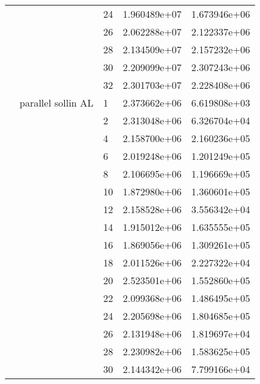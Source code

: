 \begin{tabular}{lllrr}
                      &                     & 24 &  1.960489e+07 &  1.673946e+06 \\
                      &                     & 26 &  2.062288e+07 &  2.122337e+06 \\
                      &                     & 28 &  2.134509e+07 &  2.157232e+06 \\
                      &                     & 30 &  2.209099e+07 &  2.307243e+06 \\
                      &                     & 32 &  2.301703e+07 &  2.228408e+06 \\
                      & parallel sollin AL & 1  &  2.373662e+06 &  6.619808e+03 \\
                      &                     & 2  &  2.313048e+06 &  6.326704e+04 \\
                      &                     & 4  &  2.158700e+06 &  2.160236e+05 \\
                      &                     & 6  &  2.019248e+06 &  1.201249e+05 \\
                      &                     & 8  &  2.106695e+06 &  1.196669e+05 \\
                      &                     & 10 &  1.872980e+06 &  1.360601e+05 \\
                      &                     & 12 &  2.158528e+06 &  3.556342e+04 \\
                      &                     & 14 &  1.915012e+06 &  1.635555e+05 \\
                      &                     & 16 &  1.869056e+06 &  1.309261e+05 \\
                      &                     & 18 &  2.011526e+06 &  2.227322e+04 \\
                      &                     & 20 &  2.523501e+06 &  1.552860e+05 \\
                      &                     & 22 &  2.099368e+06 &  1.486495e+05 \\
                      &                     & 24 &  2.205698e+06 &  1.804685e+05 \\
                      &                     & 26 &  2.131948e+06 &  1.819697e+04 \\
                      &                     & 28 &  2.230982e+06 &  1.583625e+05 \\
                      &                     & 30 &  2.144342e+06 &  7.799166e+04 \\

\end{tabular}
